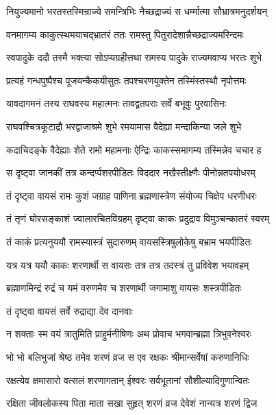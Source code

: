 \twolineshloka
{नियुज्यमानो भरतस्तस्मिन्राज्ये समन्त्रिभिः}
{नैच्छद्राज्यं स धर्म्मात्मा सौभ्रात्रमनुदर्शयन्}%

\twolineshloka
{वनमागम्य काकुत्स्थमयाचद्भ्रातरं ततः}
{रामस्तु पितुरादेशान्नैच्छद्राज्यमरिन्दमः}%

\twolineshloka
{स्वपादुके ददौ तस्मै भक्त्या सोऽप्यग्रहीत्तथा}
{रामस्य पादुके राज्यमवाप्य भरतः शुभे}%

\twolineshloka
{प्रत्यहं गन्धपुष्पैश्च पूजयन्कैकयीसुतः}
{तपश्चरणयुक्तेन तस्मिंस्तस्थौ नृपोत्तमः}%

\twolineshloka
{यावदागमनं तस्य राघवस्य महात्मनः}
{तावद्व्रतपराः सर्वे बभूवुः पुरवासिनः}%

\twolineshloka
{राघवश्चित्रकूटाद्रौ भरद्वाजाश्रमे शुभे}
{रमयामास वैदेह्या मन्दाकिन्या जले शुभे}%

\twolineshloka
{कदाचिदङ्के वैदेह्याः शेते रामो महामनाः}
{ऐन्द्रिः काकस्समागम्य तस्मिन्नेव चचार ह}%

\twolineshloka
{स दृष्ट्वा जानकीं तत्र कन्दर्प्पशरपीडितः}
{विददार नखैस्तीक्ष्णैः पीनोन्नतपयोधरम्}%

\twolineshloka
{तं दृष्ट्वा वायसं रामः कुशं जग्राह पाणिना}
{ब्रह्मणास्त्रेण संयोज्य चिक्षेप धरणीधरः}%

\twolineshloka
{तं तृणं घोरसङ्काशं ज्वालारचितविग्रहम्}
{दृष्ट्वा काकः प्रदुद्राव विमुञ्चन्कातरं स्वरम्}%

\twolineshloka
{तं काकं प्रत्यनुययौ रामस्यास्त्रं सुदारुणम्}
{वायसस्त्रिषुलोकेषु बभ्राम भयपीडितः}%

\twolineshloka
{यत्र यत्र ययौ काकः शरणार्थी स वायसः}
{तत्र तत्र तदस्त्रं तु प्रविवेश भयावहम्}%

\twolineshloka
{ब्रह्माणमिन्द्रं रुद्रं च यमं वरुणमेव च}
{शरणार्थी जगामाशु वायसः शस्त्रपीडितः}%

तं दृष्ट्वा वायसं सर्वे रुद्राद्या देव दानवाः

\twolineshloka
{न शक्ताः स्म वयं त्रातुमिति प्राहुर्मनीषिणः}
{अथ प्रोवाच भगवान्ब्रह्मा त्रिभुवनेश्वरः}%


\twolineshloka
{भो भो बलिभुजां श्रेष्ठ तमेव शरणं व्रज}
{स एव रक्षकः श्रीमान्सर्वेषां करुणानिधिः}%

\twolineshloka
{रक्षत्येव क्षमासारो वत्सलं शरणागतान्}
{ईश्वरः सर्वभूतानां सौशील्यादिगुणान्वितः}%

\twolineshloka
{रक्षिता जीवलोकस्य पिता माता सखा सुहृत्}
{शरणं व्रज देवेशं नान्यत्र शरणं द्विज}%


